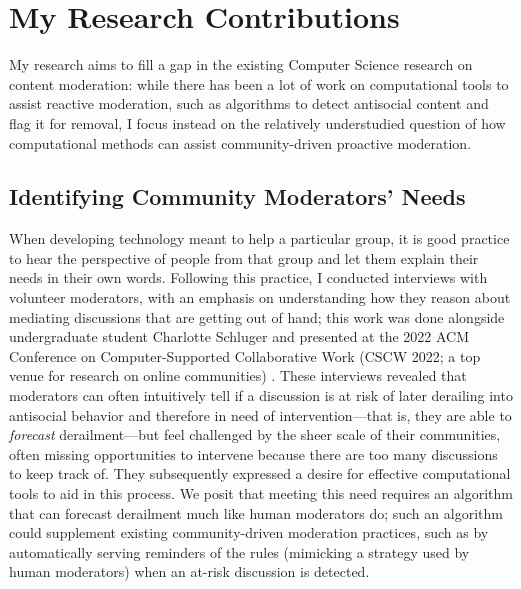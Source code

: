 \documentclass[12pt,letterpaper]{article}
\begin{document}
\section{My Research Contributions}
My research aims to fill a gap in the existing Computer Science research on content moderation: while there has been a lot of work on computational tools to assist reactive moderation, such as algorithms to detect antisocial content and flag it for removal, I focus instead on the relatively understudied question of how computational methods can assist community-driven proactive moderation.

\subsection{Identifying Community Moderators' Needs}
When developing technology meant to help a particular group, it is good practice to hear the perspective of people from that group and let them explain their needs in their own words.
Following this practice, I conducted interviews with volunteer moderators, with an emphasis on understanding how they reason about mediating discussions that are getting out of hand; this work was done alongside undergraduate student Charlotte Schluger and presented at the 2022 ACM Conference on Computer-Supported Collaborative Work (CSCW 2022; a top venue for research on online communities) \cite{schluger_proactive_2022}.
These interviews revealed that moderators can often intuitively tell if a discussion is at risk of later derailing into antisocial behavior and therefore in need of intervention---that is, they are able to \emph{forecast} derailment---but feel challenged by the sheer scale of their communities, often missing opportunities to intervene because there are too many discussions to keep track of.
They subsequently expressed a desire for effective computational tools to aid in this process.
We posit that meeting this need requires an algorithm that can forecast derailment much like human moderators do; such an algorithm could supplement existing community-driven moderation practices, such as by automatically serving reminders of the rules (mimicking a strategy used by human moderators) when an at-risk discussion is detected.
\end{document}
